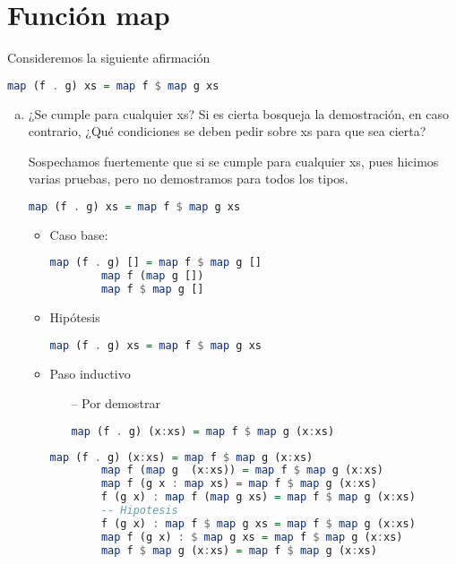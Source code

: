 \documentclass[spanish,12pt,letterpaper]{article}
\begin{document}
  \section{Función map}
  Consideremos la siguiente afirmación
  \begin{lstlisting}[language=Haskell]
    map (f . g) xs = map f $ map g xs
  \end{lstlisting}
  \begin{enumerate}[(a)]
  \item ¿Se cumple para cualquier xs? Si es cierta bosqueja la demostración, en
    caso contrario, ¿Qué condiciones se deben pedir sobre xs para que sea cierta?

    Sospechamos fuertemente que si se cumple para cualquier xs, pues hicimos
    varias pruebas, pero no demostramos para todos los tipos.

    \begin{lstlisting}[language=Haskell]
      map (f . g) xs = map f $ map g xs
    \end{lstlisting}
    \begin{itemize}
    \item Caso base:
      \begin{lstlisting}[language=Haskell]
        map (f . g) [] = map f $ map g []
        map f (map g [])
        map f $ map g []
      \end{lstlisting}
    \item Hipótesis
      \begin{lstlisting}[language=Haskell]
        map (f . g) xs = map f $ map g xs
      \end{lstlisting}
    \item Paso inductivo
      \begin{itemize}
      \item [--] Por demostrar
        \begin{lstlisting}[language=Haskell]
          map (f . g) (x:xs) = map f $ map g (x:xs)
        \end{lstlisting}
      \end{itemize}
      \begin{lstlisting}[language=Haskell]
        map (f . g) (x:xs) = map f $ map g (x:xs)
        map f (map g  (x:xs)) = map f $ map g (x:xs)
        map f (g x : map xs) = map f $ map g (x:xs)
        f (g x) : map f (map g xs) = map f $ map g (x:xs)
        -- Hipotesis
        f (g x) : map f $ map g xs = map f $ map g (x:xs)
        map f (g x) : $ map g xs = map f $ map g (x:xs)
        map f $ map g (x:xs) = map f $ map g (x:xs)
      \end{lstlisting}
    \end{itemize}    
    

\end{enumerate}
\end{document}

